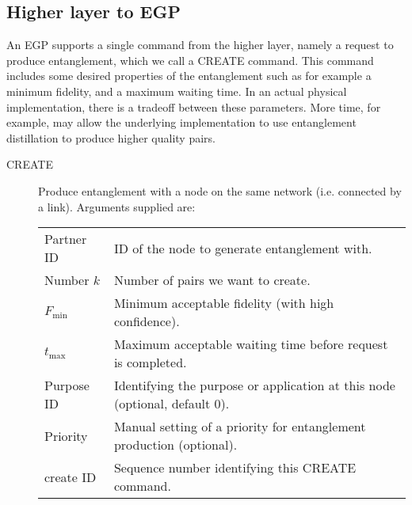 \documentclass{article}
\begin{document}
\subsection{Higher layer to EGP}
An EGP supports a single command from the higher layer, namely a request to produce entanglement, which we call a CREATE command.
This command includes some desired properties of the entanglement such as for example a minimum fidelity, and a maximum waiting time. 
In an actual physical implementation, there is a tradeoff between these parameters. More time, for example, may allow the underlying
implementation to use entanglement distillation to produce higher quality pairs. 
\begin{description}
\item[CREATE] Produce entanglement with a node on the same network (i.e. connected by a link). Arguments supplied are:\\
\noindent
\begin{tabular}{ll}
Partner ID & ID of the node to generate entanglement with. \\
Number $k$ & Number of pairs we want to create.\\
$F_{\min}$ & Minimum acceptable fidelity (with high confidence). \\
$t_{\max}$ & Maximum acceptable waiting time before request is completed. \\
Purpose ID & Identifying the purpose or application at this node (optional, default 0). \\
Priority & Manual setting of a priority for entanglement production (optional).\\
create ID & Sequence number identifying this CREATE command.
\end{tabular}
\end{description} 
\end{document}
